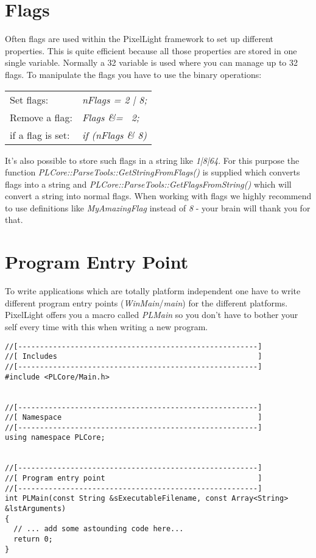 \section{Flags}
Often flags are used within the PixelLight framework to set up different properties. This is quite efficient because all those properties are stored in one single variable. Normally a \SI{32}{\bit} variable is used where you can manage up to 32 flags. To manipulate the flags you have to use the binary operations:
\begin{tabular}{ll}
Set flags:&
  \emph{nFlags = 2 | 8;}\\
Remove a flag:&
  \emph{Flags \&= ~2;}\\
if a flag is set:&
  \emph{if (nFlags \& 8)}\\
\end{tabular}
It's also possible to store such flags in a string like \emph{1|8|64}. For this purpose the function \emph{PLCore::ParseTools::GetStringFromFlags()} is supplied which converts flags into a string and \emph{PLCore::ParseTools::GetFlagsFromString()} which will convert a string into normal flags. When working with flags we highly recommend to use definitions like \emph{MyAmazingFlag} instead of \emph{8} - your brain will thank you for that.




\section{Program Entry Point}
To write applications which are totally platform independent one have to write different program entry points (\emph{WinMain}/\emph{main}) for the different platforms. PixelLight offers you a macro called \emph{PLMain} so you don't have to bother your self every time with this when writing a new program.

\begin{lstlisting}[caption=Program entry point example]
//[-------------------------------------------------------]
//[ Includes                                              ]
//[-------------------------------------------------------]
#include <PLCore/Main.h>


//[-------------------------------------------------------]
//[ Namespace                                             ]
//[-------------------------------------------------------]
using namespace PLCore;


//[-------------------------------------------------------]
//[ Program entry point                                   ]
//[-------------------------------------------------------]
int PLMain(const String &sExecutableFilename, const Array<String> &lstArguments)
{
  // ... add some astounding code here...
  return 0;
}
\end{lstlisting}

